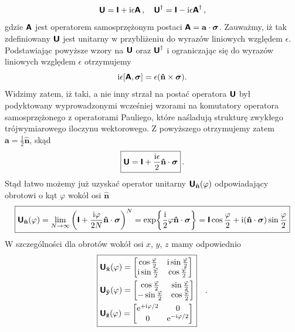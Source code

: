 \documentclass{myclass}
\begin{document}
\begin{equation*}
    \boldsymbol{\mathsf{U}} = \boldsymbol{\mathsf{I}} + \mathrm{i}\epsilon\boldsymbol{\mathsf{A}}\,,\quad \boldsymbol{\mathsf{U}}^\dagger = \boldsymbol{\mathsf{I}} - \mathrm{i}\epsilon\boldsymbol{\mathsf{A}}^\dagger\,,
\end{equation*}
gdzie \(\boldsymbol{\mathsf{A}}\) jest operatorem samosprzężonym postaci \(\boldsymbol{\mathsf{A}} =
\mathbf{a}\cdot\boldsymbol{\sigma}\). Zauważmy, iż tak zdefiniowany \(\boldsymbol{\mathsf{U}}\) jest unitarny w
przybliżeniu do wyrazów liniowych względem \(\epsilon\). Podstawiając powyższe wzory na \(\boldsymbol{\mathsf{U}}\)
oraz \(\boldsymbol{\mathsf{U}}^\dagger\) i ograniczając się do wyrazów liniowych względem \(\epsilon\) otrzymujemy
\begin{equation*}
    \mathrm{i}\epsilon[\boldsymbol{\mathsf{A}}, \boldsymbol{\sigma}] = \epsilon(\mathbf{\hat{n}}\times\boldsymbol{\sigma}).
\end{equation*}
Widzimy zatem, iż taki, a nie inny strzał na postać operatora \(\boldsymbol{\mathsf{U}}\) był podyktowany
wyprowadzonymi wcześniej wzorami na komutatory operatora samosprzężonego z operatorami Pauliego,
które naśladują strukturę zwykłego trójwymiarowego iloczynu wektorowego. Z powyższego otrzymujemy
zatem \(\mathbf{a} = \frac{1}{2}\mathbf{\hat{n}}\), skąd
\begin{equation*}\boxed{
    \boldsymbol{\mathsf{U}} = \boldsymbol{\mathsf{I}} + \frac{\mathrm{i} \epsilon}{2} \mathbf{\hat{n}} \cdot \boldsymbol{\sigma}}\,.
\end{equation*}
Stąd łatwo możemy już uzyskać operator unitarny \(\boldsymbol{\mathsf{U}}_\mathbf{\hat{n}}(\varphi)\) odpowiadający
obrotowi o kąt \(\varphi\) wokół osi \(\mathbf{\hat{n}}\)
\begin{equation*}\boxed{
    \boldsymbol{\mathsf{U}}_\mathbf{\hat{n}}(\varphi) = \lim_{N\to\infty}\left(\boldsymbol{\mathsf{I}} + \frac{\mathrm{i} \varphi}{2N} \mathbf{\hat{n}} \cdot \boldsymbol{\sigma}\right)^N = \exp{\frac{\mathrm{i}}{2}\varphi\mathbf{\hat{n}}\cdot\boldsymbol{\sigma}} = \boldsymbol{\mathsf{I}}\cos\frac{\varphi}{2} + \mathrm{i}(\mathbf{\hat{n}}\cdot\boldsymbol{\sigma})\sin\frac{\varphi}{2}}
\end{equation*}
W szczególności dla obrotów wokół osi \(x\), \(y\), \(z\) mamy odpowiednio
\begin{equation*}\boxed{
    \begin{split}
        &\oper{U}_\mathbf{\hat{x}}(\varphi) = \mqty[\cos\frac{\varphi}{2} & \im\sin\frac{\varphi}{2} \\ \im\sin\frac{\varphi}{2} & \cos\frac{\varphi}{2}]\\
        &\oper{U}_\mathbf{\hat{y}}(\varphi) = \mqty[\cos\frac{\varphi}{2} & \sin\frac{\varphi}{2} \\ -\sin\frac{\varphi}{2} & \cos\frac{\varphi}{2}]\\
        &\oper{U}_\mathbf{\hat{z}}(\varphi) = \mqty[\e^{+\im\varphi/2} & 0 \\ 0 & \e^{-\im\varphi/2}]
    \end{split}}\quad.
\end{equation*}
\end{document}
